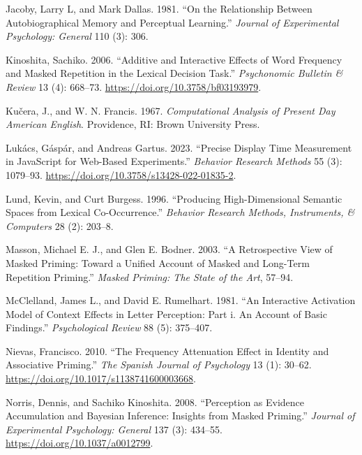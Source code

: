\documentclass[
]{interact}
\newlength{\cslhangindent}
\newenvironment{CSLReferences}[2] %
 {\begin{list}{}{%
  \setlength{\itemindent}{0pt}
  \setlength{\leftmargin}{0pt}
  \setlength{\parsep}{0pt}
  \ifodd #1
   \setlength{\leftmargin}{\cslhangindent}
   \setlength{\itemindent}{-1\cslhangindent}
  \fi
  \setlength{\itemsep}{#2\baselineskip}}}
 {\end{list}}
\begin{document}
\begin{CSLReferences}{1}{0}
Jacoby, Larry L, and Mark Dallas. 1981. {``On the Relationship Between
Autobiographical Memory and Perceptual Learning.''} \emph{Journal of
Experimental Psychology: General} 110 (3): 306.

Kinoshita, Sachiko. 2006. {``Additive and Interactive Effects of Word
Frequency and Masked Repetition in the Lexical Decision Task.''}
\emph{Psychonomic Bulletin \& Review} 13 (4): 668--73.
\url{https://doi.org/10.3758/bf03193979}.

Kučera, J., and W. N. Francis. 1967. \emph{Computational Analysis of
Present Day American English}. Providence, RI: Brown University Press.

Lukács, Gáspár, and Andreas Gartus. 2023. {``Precise Display Time
Measurement in JavaScript for Web-Based Experiments.''} \emph{Behavior
Research Methods} 55 (3): 1079--93.
\url{https://doi.org/10.3758/s13428-022-01835-2}.

Lund, Kevin, and Curt Burgess. 1996. {``Producing High-Dimensional
Semantic Spaces from Lexical Co-Occurrence.''} \emph{Behavior Research
Methods, Instruments, {\&} Computers} 28 (2): 203--8.

Masson, Michael E. J., and Glen E. Bodner. 2003. {``A Retrospective View
of Masked Priming: Toward a Unified Account of Masked and Long-Term
Repetition Priming.''} \emph{Masked Priming: The State of the Art},
57--94.

McClelland, James L., and David E. Rumelhart. 1981. {``An Interactive
Activation Model of Context Effects in Letter Perception: Part i. An
Account of Basic Findings.''} \emph{Psychological Review} 88 (5):
375--407.

Nievas, Francisco. 2010. {``The Frequency Attenuation Effect in Identity
and Associative Priming.''} \emph{The Spanish Journal of Psychology} 13
(1): 30--62. \url{https://doi.org/10.1017/s1138741600003668}.

Norris, Dennis, and Sachiko Kinoshita. 2008. {``Perception as Evidence
Accumulation and Bayesian Inference: Insights from Masked Priming.''}
\emph{Journal of Experimental Psychology: General} 137 (3): 434--55.
\url{https://doi.org/10.1037/a0012799}.


\end{CSLReferences}
\end{document}
